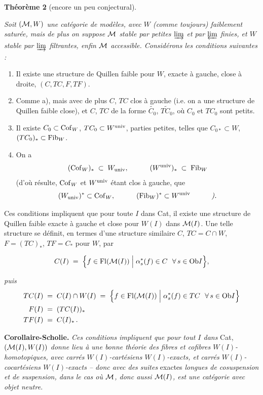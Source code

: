\textbf{Théorème 2} (encore un peu conjectural). {\itshape Soit $(\mathcal{M},W)$ une catégorie de modèles, avec $W$ (comme toujours) faiblement saturée, mais de plus on suppose $\mathcal{M}$ stable par petites $\mathop{\underrightarrow{\mathrm{lim}}}$ et par $\mathop{\underleftarrow{\mathrm{lim}}}$ finies, et $W$ stable par $\mathop{\underrightarrow{\mathrm{lim}}}$ filtrantes, enfin $\mathcal{M}$ accessible. Considérons les conditions suivantes :

\begin{enumerate}
\item[\textup{a)}] Il existe une structure de Quillen faible pour $W$, exacte à gauche, close à droite, $(C,TC,F,TF)$.
\item[\textup{a$'$)}] Comme \textup{a)}, mais avec de plus $C$, $TC$ clos à gauche (\textup{i.e.} on a une structure de Quillen faible close), et $C$, $TC$ de la forme $\widetilde{C_0}$, $\widetilde{TC_0}$, où $C_0$ et $TC_0$ sont petits.
\item[\textup{a$''$)}] Il existe $C_0 \subset \mathrm{Cof}_W$, $TC_0 \subset W^{\mathrm{univ}}$, parties petites, telles que $C_{0*} \subset W$, $(TC_0)_* \subset \mathrm{Fib}_W$.
\item[\textup{b)}] On a
\[
(\mathrm{Cof}_W)_* \;\subset\; W_{\mathrm{univ}}, \qquad\quad (W^{\mathrm{univ}})_* \;\subset\; \mathrm{Fib}_W
\]
(d'où résulte, $\mathrm{Cof}_W$ et $W^{\mathrm{univ}}$ étant clos à gauche, que
\[
(W_{\mathrm{univ}})^* \subset \mathrm{Cof}_W, \qquad\quad (\mathrm{Fib}_W)^* \subset W^{\mathrm{univ}} \qquad\quad \text{\itshape ).}
\]
\end{enumerate}

\noindent{}

Ces conditions impliquent que pour toute $I$ dans \textup{Cat}, il existe une structure de Quillen faible exacte à gauche et close pour $W(I)$ dans $\mathcal{M}(I)$. Une telle structure se définit, en termes d'une structure similaire $C$, $TC = C \cap W$, $F = (TC)_*$, $TF = C_*$ pour $W$, par}
\[
C(I) \;=\; \Bigl\{ f \in \mathrm{Fl}(\mathcal{M}(I)) \Bigm| \alpha_s^*(f) \in C \ \ \forall\, s \in \mathrm{Ob} I \Bigr\},
\]

\noindent\textit{puis}
\[
\begin{aligned}
TC(I) \;&=\; C(I)\cap W(I) \;=\; \Bigl\{ f \in \mathrm{Fl}(\mathcal{M}(I)) \Bigm| \alpha_s^*(f) \in TC \ \ \forall\, s \in \mathrm{Ob} I \Bigr\}\\
F(I) \;&=\; (TC(I))_*\\
TF(I) \;&=\; C(I)_*\,.
\end{aligned}
\]

\textbf{Corollaire-Scholie.} \textit{Ces conditions impliquent que pour tout $I$ dans} Cat, \textit{$(\mathcal{M}(I),W(I))$ donne lieu à une bonne théorie des fibres et cofibres $W(I)$-homotopiques, avec carrés $W(I)$-cartésiens $W(I)$-exacts, et carrés $W(I)$-cocartésiens $W(I)$-exacts – donc avec des suites} exactes \textit{longues de cosuspension et de suspension, dans le cas où $\mathcal{M}$, donc aussi $\mathcal{M}(I)$, est une catégorie avec objet neutre.}

